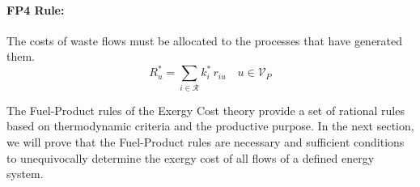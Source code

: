 \documentclass{ecos}
\begin{document}
\paragraph{FP4 Rule:} The costs of waste flows must be allocated to the processes that have generated them.
\begin{equation}
\label{eq:fprule4}
R_u^*=\sum_{i\in\mathcal{R}}{k_i^* \, r_{iu}} \quad u\in\mathcal{V}_P \tag{FP4}
\end{equation}

The Fuel-Product rules of the Exergy Cost theory provide a set of rational rules based on thermodynamic criteria and the productive purpose. In the next section, we will prove that the Fuel-Product rules are necessary and sufficient conditions to unequivocally determine the exergy cost of all flows of a defined energy system.
\end{document}
